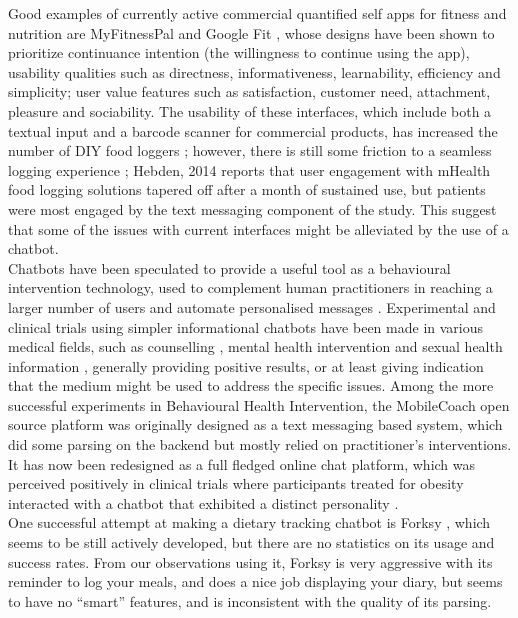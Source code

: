 Good examples of currently active commercial quantified self apps for fitness and nutrition are MyFitnessPal \cite{mfpwebsite} and Google Fit \cite{googlefitwebsite}, whose designs have been shown \cite{Suzianti2017} to prioritize continuance intention (the willingness to continue using the app), usability qualities such as directness, informativeness, learnability, efficiency and simplicity; user value features such as satisfaction, customer need, attachment, pleasure and sociability. The usability of these interfaces, which include both a textual input and a barcode scanner for commercial products, has increased the number of DIY food loggers \cite{Alonso2015}; however, there is still some friction to a seamless logging experience \cite{Boushey2016}; Hebden, 2014 \cite{hebden2014} reports that user engagement with mHealth food logging solutions tapered off after a month of sustained use, but patients were most engaged by the text messaging component of the study. This suggest that some of the issues with current interfaces might be alleviated by the use of a chatbot. \\
Chatbots have been speculated to provide a useful tool as a behavioural intervention technology, used to complement human practitioners in reaching a larger number of users and automate personalised messages \cite{Gabrielli2017}. Experimental and clinical trials using simpler informational chatbots have been made in various medical fields, such as counselling \cite{Cameron}, mental health intervention \cite{Elmasri2012} and sexual health information \cite{Brixey2017}, generally providing positive results, or at least giving indication that the medium might be used to address the specific issues.
Among the more successful experiments in Behavioural Health Intervention, the MobileCoach open source platform \cite{mobilecoacheu} was originally designed as a text messaging based system, which did some parsing on the backend but mostly relied on practitioner's interventions. It has now been redesigned as a full fledged online chat platform, which was perceived positively in clinical trials where participants treated for obesity interacted with a chatbot that exhibited a distinct personality \cite{Kowatsch2017}. \\
One successful attempt at making a dietary tracking chatbot is Forksy \cite{forksywebsite}, which seems to be still actively developed, but there are no statistics on its usage and success rates. From our observations using it, Forksy is very aggressive with its reminder to log your meals, and does a nice job displaying your diary, but seems to have no ``smart'' features, and is inconsistent with the quality of its parsing.
